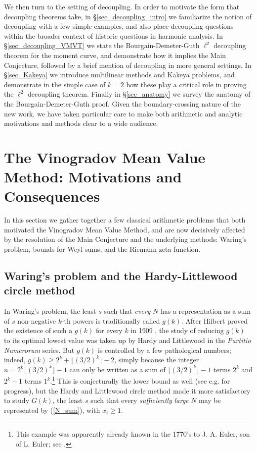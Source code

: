 \documentclass[brochure,english,12pt]{bourbaki}%
\begin{document}
We then turn to the setting of decoupling. In order to motivate the form that decoupling theorems take, in \S \ref{sec_decoupling_intro} we familiarize the notion of decoupling with a few simple examples, and also place decoupling questions within the broader context of historic questions in harmonic analysis. In \S \ref{sec_decoupling_VMVT} we state the Bourgain-Demeter-Guth $\ell^2$ decoupling theorem for the moment curve, and demonstrate how it implies the Main Conjecture, followed by a brief mention of decoupling in more general settings. In \S \ref{sec_Kakeya} we introduce multilinear methods and Kakeya problems, and demonstrate in the simple case of $k=2$ how these play a critical role in proving the $\ell^2$ decoupling theorem. Finally in \S \ref{sec_anatomy} we survey the anatomy of the Bourgain-Demeter-Guth proof. Given the boundary-crossing nature of the new work, we have taken particular care to make both arithmetic and analytic motivations and methods clear to a wide audience.

\section{The Vinogradov Mean Value Method: Motivations and Consequences}\label{sec_mot_cons}
In this section we gather together a few classical arithmetic problems that both motivated the Vinogradov Mean Value Method, and are now decisively affected by the resolution of the Main Conjecture and the underlying methods: Waring's problem, bounds for Weyl sums, and the Riemann zeta function. 


\subsection{Waring's problem and the Hardy-Littlewood circle method}
In Waring's problem, the least $s$ such that \emph{every} $N$ has a representation as a sum of $s$ non-negative $k$-th powers is traditionally called $g(k)$. After Hilbert proved the existence of such a $g(k)$ for every $k$ in 1909 \cite{Hil09},  the study of reducing $g(k)$ to its optimal lowest value was taken up by Hardy and Littlewood in the \emph{Partitio Numerorum} series. But $g(k)$ is controlled by a few pathological numbers; indeed,  $g(k) \geq 2^k + \lfloor (3/2)^k \rfloor -2$, simply because the integer $n=2^k \lfloor (3/2)^k \rfloor -1$ can only be written as a sum of $\lfloor (3/2)^k \rfloor -1$ terms $2^k$ and   $2^k-1$ terms $1^k$.\footnote{This example was apparently already known in the 1770's to J. A. Euler, son of L. Euler; see \cite[Item 36 p. 203-204]{Eul62}.}  This is conjecturally the lower bound as well (see e.g. \cite[Ch. 1]{Vau97} for progress),
but the Hardy and Littlewood circle method \cite{HarLit20} made it more satisfactory to study $G(k)$, the least $s$ such that every \emph{sufficiently large} $N$ may be represented by (\ref{N_sum}), with $x_i \geq 1$.
\end{document}
